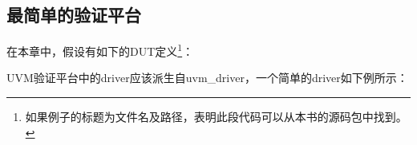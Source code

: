 \subsection{最简单的验证平台}\label{subsec2-2-1}
在本章中，假设有如下的DUT定义\footnote{如果例子的标题为文件名及路径，表明此段代码可以从本书的源码包中找到。}：



UVM验证平台中的driver应该派生自uvm\_driver，一个简单的driver如下例所示：


